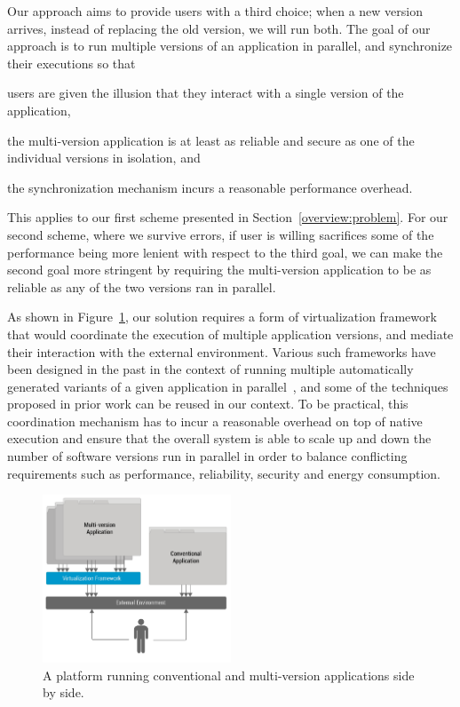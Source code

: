 Our approach aims to provide users with a third choice; when a new version
arrives, instead of replacing the old version, we will run both. The goal
of our approach is to run multiple versions of an application in parallel, and
synchronize their executions so that%
\begin{inparaenum}[(1)]
\item users are given the illusion that they interact with a single version of
  the application,
\item the multi-version application is at least as reliable and secure as one
  of the individual versions in isolation, and
\item the synchronization mechanism incurs a reasonable performance overhead.
\end{inparaenum}
This applies to our first scheme presented in Section~\ref{overview:problem}.
For our second scheme, where we survive errors, if user is willing sacrifices
some of the performance being more lenient with respect to the third goal, we
can make the second goal more stringent by requiring the multi-version
application to be as reliable as any of the two versions ran in parallel.

As shown in Figure~\ref{fig:mx-platform}, our solution requires a form of
virtualization framework that would coordinate the execution of multiple
application versions, and mediate their interaction with the external
environment. Various such frameworks have been designed in the past in the
context of running multiple automatically generated variants of a given
application in parallel~\cite{diehard06,cox2006,orchestra09}, and some of the
techniques proposed in prior work can be reused in our context.  To be
practical, this coordination mechanism has to incur a reasonable overhead on
top of native execution and ensure that the overall system is able to scale up
and down the number of software versions run in parallel in order to balance
conflicting requirements such as performance, reliability, security and energy
consumption.

\begin{figure}[t]
  \begin{center}
    \includegraphics[width=0.5\textwidth]{multi-version/figures/platform}
    \caption{A platform running conventional and multi-version
      applications side by side.}
    \label{fig:mx-platform}
  \end{center}
\end{figure}

